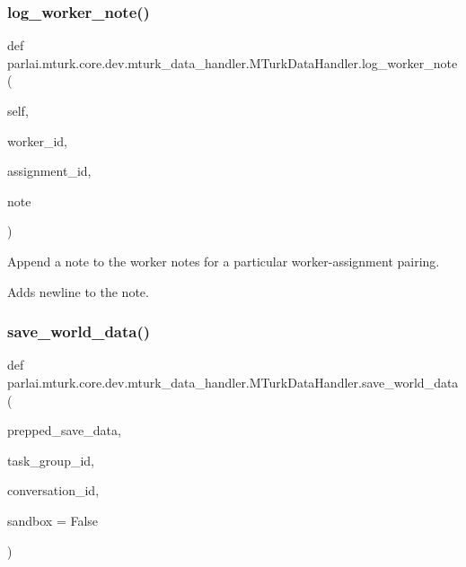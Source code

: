 \subsubsection{\texorpdfstring{log\+\_\+worker\+\_\+note()}{log\_worker\_note()}}
{\footnotesize\ttfamily def parlai.\+mturk.\+core.\+dev.\+mturk\+\_\+data\+\_\+handler.\+M\+Turk\+Data\+Handler.\+log\+\_\+worker\+\_\+note (\begin{DoxyParamCaption}\item[{}]{self,  }\item[{}]{worker\+\_\+id,  }\item[{}]{assignment\+\_\+id,  }\item[{}]{note }\end{DoxyParamCaption})}

\begin{DoxyVerb}Append a note to the worker notes for a particular worker-assignment pairing.

Adds newline to the note.
\end{DoxyVerb}
 \mbox{\label{classparlai_1_1mturk_1_1core_1_1dev_1_1mturk__data__handler_1_1MTurkDataHandler_a6d5a47cdeede36a2fb650f28dd72ef12}} 
\subsubsection{\texorpdfstring{save\+\_\+world\+\_\+data()}{save\_world\_data()}}
{\footnotesize\ttfamily def parlai.\+mturk.\+core.\+dev.\+mturk\+\_\+data\+\_\+handler.\+M\+Turk\+Data\+Handler.\+save\+\_\+world\+\_\+data (\begin{DoxyParamCaption}\item[{}]{prepped\+\_\+save\+\_\+data,  }\item[{}]{task\+\_\+group\+\_\+id,  }\item[{}]{conversation\+\_\+id,  }\item[{}]{sandbox = {\ttfamily False} }\end{DoxyParamCaption})\hspace{0.3cm}{\ttfamily [static]}}



